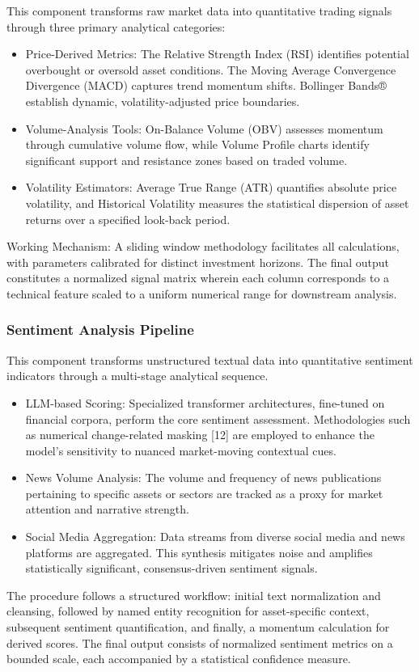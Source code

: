 \documentclass{singlecol-new}
\theoremstyle{TH}{
\newtheorem{lemma}{Lemma}
\newtheorem{theorem}[lemma]{Theorem}
\newtheorem{corrolary}[lemma]{Corrolary}
\newtheorem{conjecture}[lemma]{Conjecture}
\newtheorem{proposition}[lemma]{Proposition}
\newtheorem{claim}[lemma]{Claim}
\newtheorem{stheorem}[lemma]{Wrong Theorem}
\newtheorem{algorithm}{Algorithm}
}
\theoremstyle{THrm}{
\newtheorem{definition}{Definition}[section]
\newtheorem{question}{Question}[section]
\newtheorem{remark}{Remark}
\newtheorem{scheme}{Scheme}
}
\theoremstyle{THhit}{
\newtheorem{case}{Case}[section]
}
\begin{document}
This component transforms raw market data into quantitative trading signals through three primary analytical categories:
\begin{itemize}
    \item Price-Derived Metrics: The Relative Strength Index (RSI) identifies potential overbought or oversold asset conditions. The Moving Average Convergence Divergence (MACD) captures trend momentum shifts. Bollinger Bands® establish dynamic, volatility-adjusted price boundaries.
    \item Volume-Analysis Tools: On-Balance Volume (OBV) assesses momentum through cumulative volume flow, while Volume Profile charts identify significant support and resistance zones based on traded volume.
    \item Volatility Estimators: Average True Range (ATR) quantifies absolute price volatility, and Historical Volatility measures the statistical dispersion of asset returns over a specified look-back period.
    
\end{itemize}
Working Mechanism: A sliding window methodology facilitates all calculations, with parameters calibrated for distinct investment horizons. The final output constitutes a normalized signal matrix wherein each column corresponds to a technical feature scaled to a uniform numerical range for downstream analysis.


\subsubsection{Sentiment Analysis Pipeline}

This component transforms unstructured textual data into quantitative sentiment indicators through a multi-stage analytical sequence.
\begin{itemize}
    \item LLM-based Scoring: Specialized transformer architectures, fine-tuned on financial corpora, perform the core sentiment assessment. Methodologies such as numerical change-related masking [12] are employed to enhance the model's sensitivity to nuanced market-moving contextual cues.
    \item News Volume Analysis: The volume and frequency of news publications pertaining to specific assets or sectors are tracked as a proxy for market attention and narrative strength.
    \item Social Media Aggregation: Data streams from diverse social media and news platforms are aggregated. This synthesis mitigates noise and amplifies statistically significant, consensus-driven sentiment signals.
\end{itemize}
The procedure follows a structured workflow: initial text normalization and cleansing, followed by named entity recognition for asset-specific context, subsequent sentiment quantification, and finally, a momentum calculation for derived scores. The final output consists of normalized sentiment metrics on a bounded scale, each accompanied by a statistical confidence measure.
\end{document}
